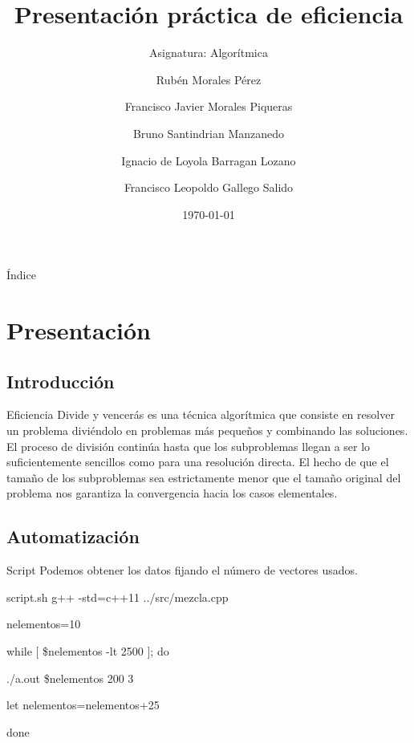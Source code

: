 \documentclass[compress]{beamer}
\title{Presentación práctica de eficiencia}                                               %
\subtitle{Asignatura: Algorítmica}                                  %
\author{Rubén Morales Pérez
		\and Francisco Javier Morales Piqueras
		\and Bruno Santindrian Manzanedo
		\and Ignacio de Loyola Barragan Lozano
		\and Francisco Leopoldo Gallego Salido}
\date{\today}                                                            %
\begin{document}
\begin{frame}
\titlepage
\end{frame}
\begin{frame}{Índice}
  \hypertarget{index}{}
  \tableofcontents
\end{frame}


\section{Presentación}
\subsection{Introducción}
\begin{frame}
	\begin{block}{Eficiencia}
	Divide y vencerás es una técnica algorítmica que consiste en resolver un problema 			diviéndolo en problemas más pequeños y combinando las soluciones. 
	El proceso de división continúa hasta que los subproblemas llegan a ser lo 					suficientemente sencillos como para una resolución directa.
	El hecho de que el tamaño de los subproblemas sea estrictamente menor que el tamaño 			original del problema nos garantiza la convergencia hacia los casos elementales.				\end{block}
	
\end{frame}

\subsection{Automatización}
\begin{frame}
	\begin{block}{Script}
		Podemos obtener los datos fijando el n\'umero de vectores usados.
	\end{block}
	
	\begin{exampleblock}{script.sh}
	g++ -std=c++11 ../src/mezcla.cpp

	nelementos=10

	while [ \$nelementos -lt 2500 ]; do
    
    		./a.out \$nelementos 200 3
    
    		let nelementos=nelementos+25
	
	done
	\end{exampleblock}
\end{frame}

\end{document}
